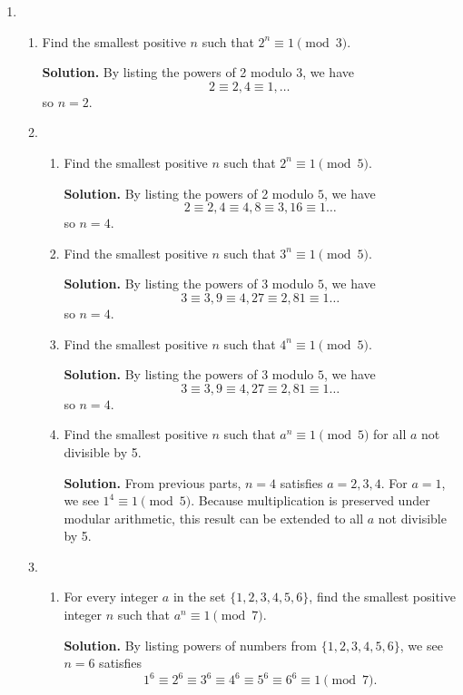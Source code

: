 \documentclass[11pt]{article}
\theoremstyle{definition}
\begin{document}
\begin{enumerate}
\addtocounter{enumi}{\value{problem_count}}

\item \addtocounter{problem_count}{1}
\begin{enumerate}
\item Find the smallest positive $n$ such that $2^n \equiv 1 \pmod{3}$.

\textbf{Solution.}
By listing the powers of 2 modulo $3$, we have
\[2 \equiv 2, 4 \equiv 1, \ldots\]
so $n = 2$.

\item 
\begin{enumerate}
\item Find the smallest positive $n$ such that $2^n \equiv 1 \pmod{5}$.

\textbf{Solution.}
By listing the powers of 2 modulo $5$, we have
\[2 \equiv 2, 4 \equiv 4, 8 \equiv 3, 16 \equiv1 \ldots\]
so $n = 4$.

\item Find the smallest positive $n$ such that $3^n \equiv 1 \pmod{5}$.

\textbf{Solution.}
By listing the powers of 3 modulo $5$, we have
\[3 \equiv 3, 9 \equiv 4, 27 \equiv 2, 81 \equiv1 \ldots\]
so $n = 4$.

\item Find the smallest positive $n$ such that $4^n \equiv 1 \pmod{5}$.

\textbf{Solution.}
By listing the powers of 3 modulo $5$, we have
\[3 \equiv 3, 9 \equiv 4, 27 \equiv 2, 81 \equiv1 \ldots\]
so $n = 4$.

\item Find the smallest positive $n$ such that $a^n \equiv 1 \pmod{5}$ for all $a$ not divisible by 5.

\textbf{Solution.}
From previous parts, $n = 4$ satisfies $a=2,3,4$. For $a = 1$, we see $1^4 \equiv 1 \pmod{5}$. Because multiplication is preserved under modular arithmetic, this result can be extended to all $a$ not divisible by 5.

\end{enumerate}
\item
\begin{enumerate}
\item For every integer $a$ in the set $\{1,2,3,4,5,6\}$,
find the smallest positive integer $n$ such that $a^n \equiv 1 \pmod{7}$.

\textbf{Solution.}
By listing powers of numbers from $\{1,2,3,4,5,6\}$, we see $n = 6$ satisfies
\[1^6 \equiv 2^6 \equiv 3^6 \equiv 4^6 \equiv 5^6 \equiv 6^6 \equiv 1 \pmod{7}.\]


\end{enumerate}
\end{enumerate}
\end{enumerate}
\end{document}
